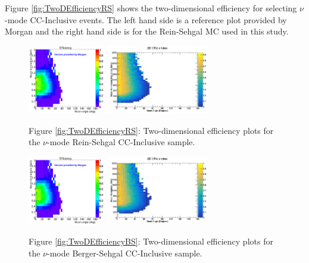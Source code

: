\documentclass[11pt]{article}
\begin{document}
Figure \ref{fig:TwoDEfficiencyRS} shows the two-dimensional efficiency for selecting $\nu$-mode CC-Inclusive events. The left hand side is a reference plot provided by Morgan and the right hand side is for the Rein-Sehgal MC used in this study.

\begin{figure}[H]
\centering
\includegraphics[width=0.3\textwidth]{CCInclusivePlots/MorgansCCInclusiveSample.png}
\includegraphics[width=0.4\textwidth]{CCInclusivePlots/2DEffCompareNMRS.png}
\caption*{Figure \ref*{fig:TwoDEfficiencyRS}: Two-dimensional efficiency plots for the $\nu$-mode Rein-Sehgal CC-Inclusive sample.}
\end{figure}\label{fig:TwoDEfficiencyRS}

\begin{figure}[H]
\centering
\includegraphics[width=0.3\textwidth]{CCInclusivePlots/MorgansCCInclusiveSample.png}
\includegraphics[width=0.4\textwidth]{CCInclusivePlots/2DEffCompareNMBS.png}
\caption*{Figure \ref*{fig:TwoDEfficiencyBS}: Two-dimensional efficiency plots for the $\nu$-mode Berger-Sehgal CC-Inclusive sample.}
\end{figure}\label{fig:TwoDEfficiencyBS}
\end{document}
